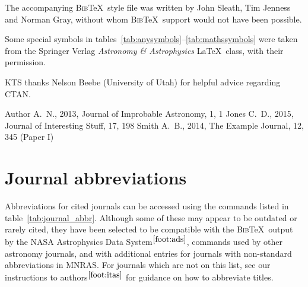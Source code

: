 \documentclass[fleqn,usenatbib,useAMS]{mnras}
\newcommand{\bibtex}{\textsc{Bib}\!\TeX} %
\begin{document}
The accompanying \bibtex\ style file was written by John Sleath, Tim Jenness and Norman Gray, without whom \bibtex\ support would not have been possible.

Some special symbols in tables~\ref{tab:anysymbols}--\ref{tab:mathssymbols} were taken from the Springer Verlag \textit{Astronomy \& Astrophysics} \LaTeX\ class, with their permission.

KTS thanks Nelson Beebe (University of Utah) for helpful advice regarding CTAN.




%


\begin{thebibliography}{99}
Author A.~N., 2013, Journal of Improbable Astronomy, 1, 1
Jones C.~D., 2015, Journal of Interesting Stuff, 17, 198
Smith A.~B., 2014, The Example Journal, 12, 345 (Paper I)
\end{thebibliography}




\appendix
\section{Journal abbreviations}
\label{sec:abbreviations}
Abbreviations for cited journals can be accessed using the commands listed in table~\ref{tab:journal_abbr}.
Although some of these may appear to be outdated or rarely cited, they have been selected to be compatible with the \bibtex\ output by the NASA Astrophysics Data System$^{\ref{foot:ads}}$, commands used by other astronomy journals, and with additional entries for journals with non-standard abbreviations in MNRAS.
For journals which are not on this list, see our instructions to authors$^{\ref{foot:itas}}$ for guidance on how to abbreviate titles.
\end{document}
